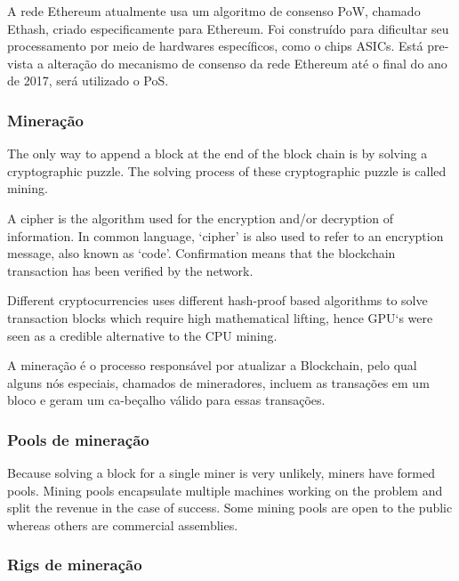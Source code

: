 \documentclass[
	article,			%
	12pt,				%
	openright,			%
	oneside,			%
	a4paper,			%
	chapter=TITLE,		%
	section=TITLE,		%
	subsection=TITLE,	%
	subsubsection=TITLE,%
	subsubsubsection=TITLE, %
	english,			%
	brazil,				%
	]{abntex2}
\begin{document}
A rede Ethereum atualmente usa um algoritmo de consenso PoW, chamado Ethash, criado especificamente para Ethereum. Foi construído para dificultar seu processamento por meio de hardwares específicos, como o chips ASICs. Está pre-vista a alteração do mecanismo de consenso da rede Ethereum até o final do ano de 2017, será utilizado o PoS.

\cite{Dlamini2017}

\subsubsection{Mineração}

The only way to append a block at the end of the block chain is by solving a cryptographic puzzle. The solving process of these cryptographic puzzle is called
mining.

\cite{Weber2012}

A cipher is the algorithm used for the encryption and/or decryption of information. In common language, ‘cipher’ is also used to refer to an encryption message, also known as ‘code’. Confirmation means that the blockchain transaction has been verified by the network.

\cite{Arsov}

Different cryptocurrencies uses different hash-proof based algorithms to solve transaction blocks which require high mathematical lifting, hence GPU‘s were seen as a credible alternative to the CPU mining.

\cite{Krishnan2015}

A mineração é o processo responsável por atualizar a Blockchain, pelo qual alguns nós especiais, chamados de mineradores, incluem as transações em um bloco e geram um ca-beçalho válido para essas transações.

\cite{LChicarino}

\subsubsection{Pools de mineração}

Because solving a block for a single miner is very unlikely, miners have formed pools. Mining pools encapsulate multiple machines working on the problem and split the revenue in the case of success. Some mining pools are open to the public whereas others are commercial assemblies.

\cite{Weber2012}

\subsubsection{Rigs de mineração}
\end{document}
